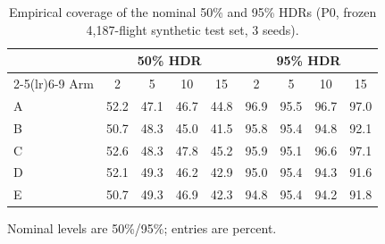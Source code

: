 \begin{table}[htbp]
\centering
\caption{Empirical coverage of the nominal 50\% and 95\% HDRs (P0, frozen 4,187-flight synthetic test set, 3 seeds).}
\label{tab:p0-coverage}
\small
\begin{tabular}{lcccccccc}
\toprule
 & \multicolumn{4}{c}{50\% HDR} & \multicolumn{4}{c}{95\% HDR} \\
\cmidrule(lr){2-5}\cmidrule(lr){6-9}
Arm & 2 & 5 & 10 & 15 & 2 & 5 & 10 & 15 \\
\midrule
A & 52.2 & 47.1 & 46.7 & 44.8 & 96.9 & 95.5 & 96.7 & 97.0 \\
B & 50.7 & 48.3 & 45.0 & 41.5 & 95.8 & 95.4 & 94.8 & 92.1 \\
C & 52.6 & 48.3 & 47.8 & 45.2 & 95.9 & 95.1 & 96.6 & 97.1 \\
D & 52.1 & 49.3 & 46.2 & 42.9 & 95.0 & 95.4 & 94.3 & 91.6 \\
E & 50.7 & 49.3 & 46.9 & 42.3 & 94.8 & 95.4 & 94.2 & 91.8 \\
\bottomrule
\end{tabular}
\par\smallskip\footnotesize Nominal levels are 50\%/95\%; entries are percent.
\end{table}
